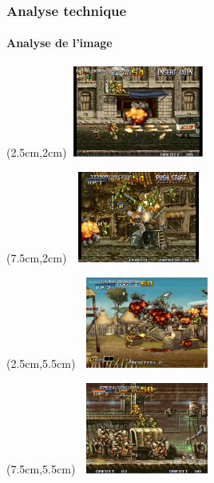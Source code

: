 \begin{frame}

	\frametitle{Analyse technique}
	\framesubtitle{Analyse de l'image}

	\begin{textblock*}{4.5cm}(2.5cm,2cm)
		\includegraphics[width=4.5cm,height=3cm]{figures/screen_jeuorigine_1.jpg}
	\end{textblock*}

	\begin{textblock*}{4.5cm}(7.5cm,2cm)
		\includegraphics[width=4.5cm,height=3cm]{figures/screen_jeuorigine_2.jpg}
	\end{textblock*}

	\begin{textblock*}{4.5cm}(2.5cm,5.5cm)
		\includegraphics[width=4.5cm,height=3cm]{figures/screen_jeuorigine_3.jpg}
	\end{textblock*}

	\begin{textblock*}{4.5cm}(7.5cm,5.5cm)
		\includegraphics[width=4.5cm,height=3cm]{figures/screen_jeuorigine_4.png}
	\end{textblock*}

\end{frame}
